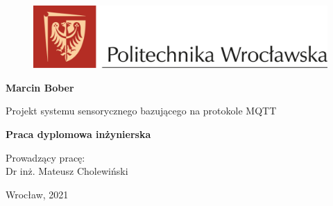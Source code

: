 
\begin{titlepage}
  \begin{center}

    \begin{figure}[ht]
      \includegraphics[width=1\textwidth]{img/pwr.png}
    \end{figure}

    \vspace{4cm}
    \textbf{\huge Marcin Bober}
    \vspace{0.5cm}

    Projekt systemu sensorycznego bazującego na protokole MQTT
    \vspace{0.5cm}

    \textbf{\Large Praca dyplomowa inżynierska}
    

    \vspace{7cm}

    \begin{flushleft}
      Prowadzący pracę: \\
      Dr inż. Mateusz Cholewiński
    \end{flushleft}


    \vfill
    Wrocław, 2021
    

  \end{center}
\end{titlepage}

